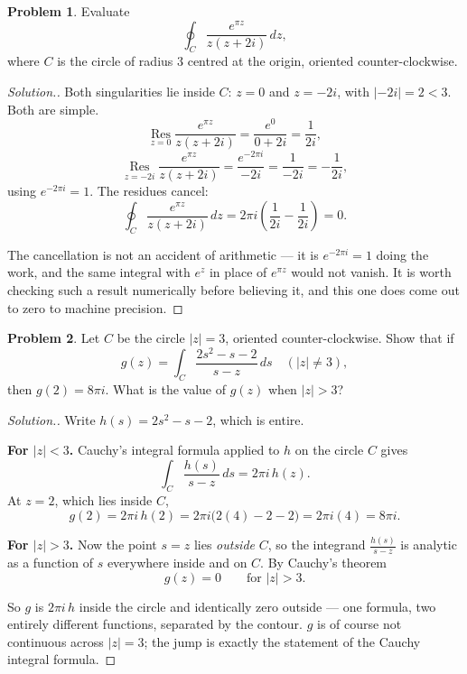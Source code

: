 \documentclass[11pt,a4paper]{article}
\theoremstyle{definition}
\newtheorem{problemx}{Problem}[section]
\newenvironment{problem}{\begin{problemx}}{\end{problemx}}
\newenvironment{solution}
  {\renewcommand{\qedsymbol}{}\begin{proof}[\textit{Solution}.]}
  {\end{proof}}
\begin{document}
\begin{problem}
Evaluate
$$\oint_{C}\frac{e^{\pi z}}{z(z + 2i)}\,dz,$$
where $C$ is the circle of radius $3$ centred at the origin, oriented
counter-clockwise.
\end{problem}

\begin{solution}
Both singularities lie inside $C$: $z = 0$ and $z = -2i$, with
$\left|-2i\right| = 2 < 3$. Both are simple.
$$\operatorname*{Res}_{z=0}\frac{e^{\pi z}}{z(z+2i)}
= \frac{e^{0}}{0 + 2i} = \frac{1}{2i},$$
$$\operatorname*{Res}_{z=-2i}\frac{e^{\pi z}}{z(z+2i)}
= \frac{e^{-2\pi i}}{-2i} = \frac{1}{-2i} = -\frac{1}{2i},$$
using $e^{-2\pi i} = 1$. The residues cancel:
$$\oint_{C}\frac{e^{\pi z}}{z(z+2i)}\,dz = 2\pi i\left(\frac{1}{2i} - \frac{1}{2i}\right)
= \boxed{0 .}$$

The cancellation is not an accident of arithmetic --- it is $e^{-2\pi i} = 1$ doing
the work, and the same integral with $e^{z}$ in place of $e^{\pi z}$ would not
vanish. It is worth checking such a result numerically before believing it, and
this one does come out to zero to machine precision.
\end{solution}


\begin{problem}
Let $C$ be the circle $\left|z\right| = 3$, oriented counter-clockwise. Show that
if
$$g(z) = \int_{C}\frac{2s^{2} - s - 2}{s - z}\,ds
\quad \left(\left|z\right| \neq 3\right),$$
then $g(2) = 8\pi i$. What is the value of $g(z)$ when $\left|z\right| > 3$?
\end{problem}

\begin{solution}
Write $h(s) = 2s^{2} - s - 2$, which is entire.

\textbf{For $\left|z\right| < 3$.} Cauchy's integral formula applied to $h$ on the
circle $C$ gives
$$\int_{C}\frac{h(s)}{s-z}\,ds = 2\pi i\,h(z).$$
At $z = 2$, which lies inside $C$,
$$g(2) = 2\pi i\,h(2) = 2\pi i\big(2(4) - 2 - 2\big) = 2\pi i (4)
= \boxed{8\pi i .}$$

\textbf{For $\left|z\right| > 3$.} Now the point $s = z$ lies \emph{outside} $C$,
so the integrand $\frac{h(s)}{s-z}$ is analytic as a function of $s$ everywhere
inside and on $C$. By Cauchy's theorem
$$\boxed{g(z) = 0 \qquad \text{for } \left|z\right| > 3 .}$$

So $g$ is $2\pi i\,h$ inside the circle and identically zero outside --- one
formula, two entirely different functions, separated by the contour. $g$ is of
course not continuous across $\left|z\right| = 3$; the jump is exactly the
statement of the Cauchy integral formula.
\end{solution}
\end{document}
